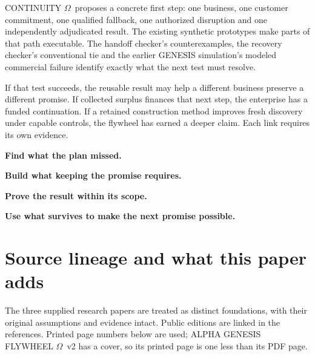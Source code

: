 \documentclass[11pt,a4paper]{article}
\newcommand{\om}{CONTINUITY $\Omega$}
\newcommand{\genesis}{ALPHA GENESIS FLYWHEEL $\Omega$}
\newcommand{\chapterpage}{\clearpage}
\begin{document}
\om\ proposes a concrete first step: one business, one customer commitment, one qualified fallback, one authorized disruption and one independently adjudicated result. The existing synthetic prototypes make parts of that path executable. The handoff checker's counterexamples, the recovery checker's conventional tie and the earlier GENESIS simulation's modeled commercial failure identify exactly what the next test must resolve.

If that test succeeds, the reusable result may help a different business preserve a different promise. If collected surplus finances that next step, the enterprise has a funded continuation. If a retained construction method improves fresh discovery under capable controls, the flywheel has earned a deeper claim. Each link requires its own evidence.

\begin{insight}
\large\textbf{Find what the plan missed.}\par
\textbf{Build what keeping the promise requires.}\par
\textbf{Prove the result within its scope.}\par
\textbf{Use what survives to make the next promise possible.}
\end{insight}

\chapterpage
\appendix
\section{Source lineage and what this paper adds}\label{app:lineage}
The three supplied research papers are treated as distinct foundations, with their original assumptions and evidence intact. Public editions are linked in the references. Printed page numbers below are used; \genesis\ v2 has a cover, so its printed page is one less than its PDF page.
\end{document}
